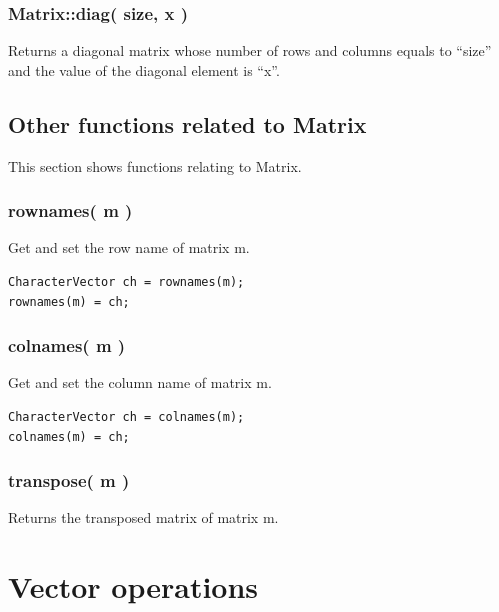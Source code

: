 \documentclass[]{book}
\begin{document}
\hypertarget{matrixdiag-size-x}{%
\subsection{Matrix::diag( size, x )}\label{matrixdiag-size-x}}

Returns a diagonal matrix whose number of rows and columns equals to ``size'' and the value of the diagonal element is ``x''.

\hypertarget{other-functions-related-to-matrix}{%
\section{Other functions related to Matrix}\label{other-functions-related-to-matrix}}

This section shows functions relating to Matrix.

\hypertarget{rownames-m}{%
\subsection{rownames( m )}\label{rownames-m}}

Get and set the row name of matrix m.

\begin{verbatim}
CharacterVector ch = rownames(m);
rownames(m) = ch;
\end{verbatim}

\hypertarget{colnames-m}{%
\subsection{colnames( m )}\label{colnames-m}}

Get and set the column name of matrix m.

\begin{verbatim}
CharacterVector ch = colnames(m);
colnames(m) = ch;
\end{verbatim}

\hypertarget{transpose-m}{%
\subsection{transpose( m )}\label{transpose-m}}

Returns the transposed matrix of matrix m.

\hypertarget{vector-operations}{%
\chapter{Vector operations}\label{vector-operations}}
\end{document}
